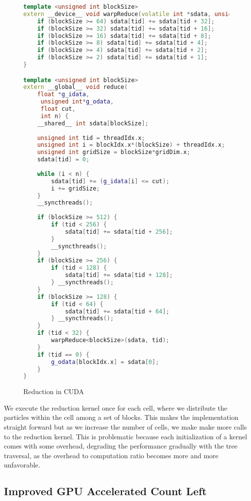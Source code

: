 \documentclass[]{article}
\begin{document}
\begin{figure}[H]
	\begin{lstlisting}[language=c++]
template <unsigned int blockSize>
extern __device__ void warpReduce(volatile int *sdata, unsigned int tid) {
	if (blockSize >= 64) sdata[tid] += sdata[tid + 32];
	if (blockSize >= 32) sdata[tid] += sdata[tid + 16];
	if (blockSize >= 16) sdata[tid] += sdata[tid + 8];
	if (blockSize >= 8) sdata[tid] += sdata[tid + 4];
	if (blockSize >= 4) sdata[tid] += sdata[tid + 2];
	if (blockSize >= 2) sdata[tid] += sdata[tid + 1];
}

template <unsigned int blockSize>
extern __global__ void reduce(
	float *g_idata,
	 unsigned int*g_odata, 
	 float cut, 
	 int n) {
	__shared__ int sdata[blockSize];
	
	unsigned int tid = threadIdx.x;
	unsigned int i = blockIdx.x*(blockSize) + threadIdx.x;
	unsigned int gridSize = blockSize*gridDim.x;
	sdata[tid] = 0;
	
	while (i < n) {
		sdata[tid] += (g_idata[i] <= cut);
		i += gridSize;
	}
	__syncthreads();
	
	if (blockSize >= 512) {
		if (tid < 256) {
			sdata[tid] += sdata[tid + 256];
		}
		__syncthreads();
	}
	if (blockSize >= 256) {
		if (tid < 128) {
			sdata[tid] += sdata[tid + 128];
		} __syncthreads();
	}
	if (blockSize >= 128) {
		if (tid < 64) {
			sdata[tid] += sdata[tid + 64];
		} __syncthreads();
	}
	if (tid < 32) {
		warpReduce<blockSize>(sdata, tid);
	}
	if (tid == 0) {
		g_odata[blockIdx.x] = sdata[0];
	}
}
	\end{lstlisting}
	\caption{Reduction in CUDA}
	\label{cuda:reduction}
\end{figure}


We execute the reduction kernel once for each cell, where we distribute the particles within the cell among a set of blocks. This makes the implementation straight forward but as we increase the number of cells, we make make more calls to the reduction kernel. This is problematic because each initialization of a kernel comes with some overhead, degrading the performance gradually with the tree traversal, as the overhead to computation ratio becomes more and more unfavorable.  



\subsection{Improved GPU Accelerated Count Left}
\end{document}
